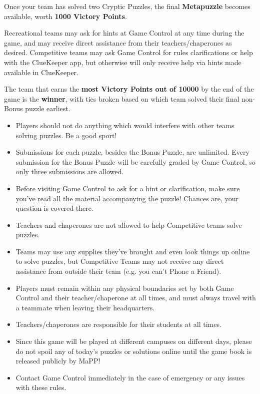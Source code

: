 
Once your team has solved two Cryptic Puzzles, the final \textbf{Metapuzzle}
becomes available, worth \textbf{1000 Victory Points}.

\newpage


Recreational teams may ask for hints at Game Control at any time during
the game, and may receive direct assistance from their teachers/chaperones
as desired.
Competitive teams may ask Game Control for rules clarifications or help
with the ClueKeeper app, but otherwise
will only receive help via hints made available in ClueKeeper.


The team that earns the \textbf{most Victory Points out of 10000}
by the end of the game is the \textbf{winner}, with ties broken based
on which team solved their final non-Bonus puzzle earliest. 


\begin{itemize}
\item Players should not do anything which
would interfere with other teams solving puzzles. Be a good sport!
\item Submissions for each puzzle, besides the Bonus Puzzle, are unlimited.
Every submission for the Bonus Puzzle will be carefully graded by Game Control,
so only three submissions are allowed.
\item Before visiting Game Control to ask for a hint or clarification, make
sure you've read all the material accompanying the puzzle! Chances are,
your question is covered there.
\item Teachers and chaperones are not allowed to help Competitive teams solve
puzzles.
\item Teams may use any supplies they've brought and even
look things up online to solve puzzles, but Competitive Teams may not receive any direct
assistance from outside their team (e.g. you can't Phone a Friend).
\item Players must remain within any physical boundaries set by both
Game Control and their teacher/chaperone at all times, and must always
travel with a teammate when leaving their headquarters.
\item Teachers/chaperones are responsible for their students at
all times.
\item Since this game will be played at different campuses on different
days, please do not spoil any of today's puzzles or solutions online until
the game book is released publicly by MaPP!
\item Contact Game Control immediately in the case of emergency
or any issues with these rules.
\end{itemize}

